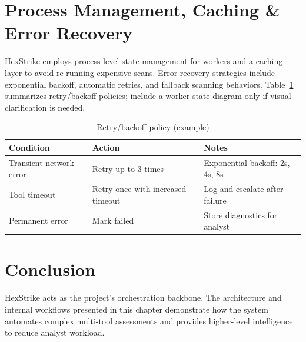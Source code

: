 \section{Process Management, Caching \& Error Recovery}

HexStrike employs process-level state management for workers and a caching layer to avoid re-running expensive scans. Error recovery strategies include exponential backoff, automatic retries, and fallback scanning behaviors. Table~\ref{tab:retry} summarizes retry/backoff policies; include a worker state diagram only if visual clarification is needed.

\begin{table}[ht]
\centering
\caption{Retry/backoff policy (example)}
\label{tab:retry}
\begin{tabular}{|l|l|l|}
\hline
Condition & Action & Notes \\
\hline
Transient network error & Retry up to 3 times & Exponential backoff: 2s, 4s, 8s \\
\hline
Tool timeout & Retry once with increased timeout & Log and escalate after failure \\
\hline
Permanent error & Mark failed & Store diagnostics for analyst \\
\hline
\end{tabular}
\end{table}


\section{Conclusion}

HexStrike acts as the project's orchestration backbone. The architecture and internal workflows presented in this chapter demonstrate how the system automates complex multi-tool assessments and provides higher-level intelligence to reduce analyst workload.